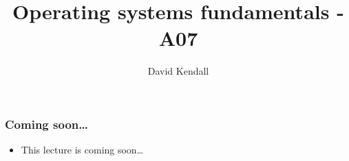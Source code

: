 \documentclass[hyperref={pdfpagelabels=false},svgnames]{beamer}
\title{Operating systems fundamentals - A07}
\subtitle{}
\author{David Kendall}
\institute{Northumbria University}
\date{}
\begin{document}
\begin{frame}
\titlepage
\end{frame}

\begin{frame}
\frametitle{Coming soon\ldots}
\begin{itemize}
  \item This lecture is coming soon\ldots
\end{itemize}
\end{frame}
\end{document}

